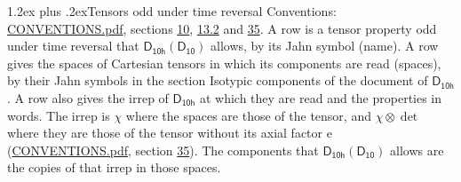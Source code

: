 \documentclass[10pt,a4paper]{article}
\makeatletter
\renewcommand\section{\@startsection{section}{1}{\z@}{-3ex plus -1ex minus -.2ex}%
  {1.2ex plus .2ex}{\normalfont\large\sffamily\bfseries\color{parttitle}}}
\numberwithin{equation}{section}
\newcommand{\grp}[1]{\mathsf{#1}}
\newcommand{\irrprod}{\otimes}
\makeatother
\begin{document}
\section{Tensors odd under time reversal}\label{s:time_odd}
Conventions: \href{../../CONVENTIONS.pdf}{CONVENTIONS.pdf}, sections \href{../../../rotation/CONVENTIONS.pdf\#conv.10}{10}, \href{../../../rotation/CONVENTIONS.pdf\#conv.13.2}{13.2} and \href{../../CONVENTIONS.pdf\#conv.35}{35}.
\leavevmode\label{n:head.name.property}A row is a tensor property odd under time reversal that $\grp{D_{10h}}(\grp{D_{10}})$ allows, by its Jahn symbol (name). \label{n:head.spaces}A row gives the spaces of Cartesian tensors in which its components are read (spaces), by their Jahn symbols in the section Isotypic components of the document of \href{../../../rotation/data/pdf/D10h.pdf}{$\grp{D_{10h}}$}. \label{n:head.properties}A row also gives the irrep of $\grp{D_{10h}}$ at which they are read and the properties in words. The irrep is $\chi$ where the spaces are those of the tensor, and $\chi \irrprod \det$ where they are those of the tensor without its axial factor e (\href{../../CONVENTIONS.pdf}{CONVENTIONS.pdf}, section \href{../../CONVENTIONS.pdf\#conv.35}{35}). The components that $\grp{D_{10h}}(\grp{D_{10}})$ allows are the copies of that irrep in those spaces.
\end{document}
